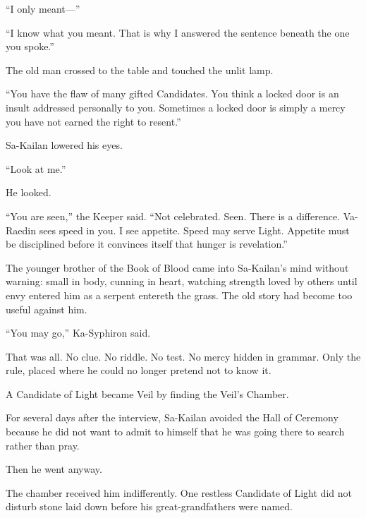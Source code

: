 “I only meant—”\par

“I know what you meant. That is why I answered the sentence beneath the one you spoke.”\par

The old man crossed to the table and touched the unlit lamp.\par

“You have the flaw of many gifted Candidates. You think a locked door is an insult addressed personally to you. Sometimes a locked door is simply a mercy you have not earned the right to resent.”\par

Sa-Kailan lowered his eyes.\par

“Look at me.”\par

He looked.\par

“You are seen,” the Keeper said. “Not celebrated. Seen. There is a difference. Va-Raedin sees speed in you. I see appetite. Speed may serve Light. Appetite must be disciplined before it convinces itself that hunger is revelation.”\par

The younger brother of the Book of Blood came into Sa-Kailan’s mind without warning: small in body, cunning in heart, watching strength loved by others until envy entered him as a serpent entereth the grass. The old story had become too useful against him.\par

“You may go,” Ka-Syphiron said.\par

That was all. No clue. No riddle. No test. No mercy hidden in grammar. Only the rule, placed where he could no longer pretend not to know it.\par

A Candidate of Light became Veil by finding the Veil’s Chamber.\par

For several days after the interview, Sa-Kailan avoided the Hall of Ceremony because he did not want to admit to himself that he was going there to search rather than pray.\par

Then he went anyway.\par

The chamber received him indifferently. One restless Candidate of Light did not disturb stone laid down before his great-grandfathers were named.\par

